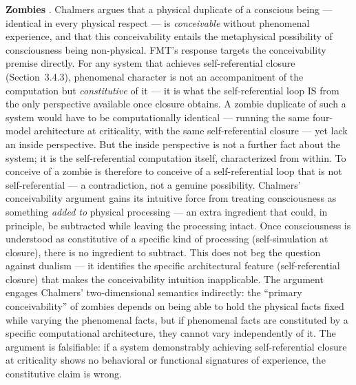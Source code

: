 \documentclass[12pt]{article}
\newcommand{\revstart}{}
\begin{document}
{\revstart\textbf{Zombies} \citep{Chalmers1996}. Chalmers argues that a physical duplicate of a conscious being --- identical in every physical respect --- is \emph{conceivable} without phenomenal experience, and that this conceivability entails the metaphysical possibility of consciousness being non-physical. FMT's response targets the conceivability premise directly. For any system that achieves self-referential closure (Section~3.4.3), phenomenal character is not an accompaniment of the computation but \emph{constitutive} of it --- it is what the self-referential loop IS from the only perspective available once closure obtains. A zombie duplicate of such a system would have to be computationally identical --- running the same four-model architecture at criticality, with the same self-referential closure --- yet lack an inside perspective. But the inside perspective is not a further fact about the system; it is the self-referential computation itself, characterized from within. To conceive of a zombie is therefore to conceive of a self-referential loop that is not self-referential --- a contradiction, not a genuine possibility. Chalmers' conceivability argument gains its intuitive force from treating consciousness as something \emph{added to} physical processing --- an extra ingredient that could, in principle, be subtracted while leaving the processing intact. Once consciousness is understood as constitutive of a specific kind of processing (self-simulation at closure), there is no ingredient to subtract. This does not beg the question against dualism --- it identifies the specific architectural feature (self-referential closure) that makes the conceivability intuition inapplicable. The argument engages Chalmers' two-dimensional semantics indirectly: the ``primary conceivability'' of zombies depends on being able to hold the physical facts fixed while varying the phenomenal facts, but if phenomenal facts are constituted by a specific computational architecture, they cannot vary independently of it. The argument is falsifiable: if a system demonstrably achieving self-referential closure at criticality shows no behavioral or functional signatures of experience, the constitutive claim is wrong.

}
\end{document}
